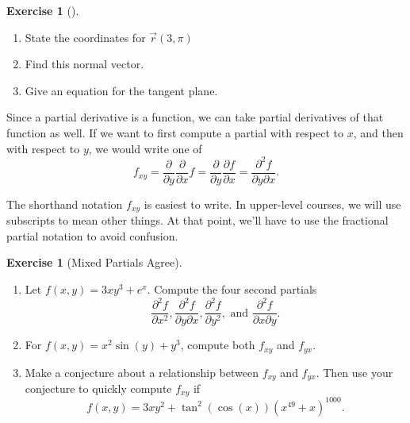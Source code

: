 \documentclass[10pt,]{book}
\theoremstyle{plain}
\theoremstyle{definition}
\theoremstyle{definition}
\theoremstyle{definition}
\theoremstyle{definition}
\newtheorem{exploration}[project]{Exercise}
\theoremstyle{definition}
\numberwithin{equation}{section}
\newcommand{\ds}{\displaystyle}
\begin{document}
\begin{exploration}[]\label{exploration-140}
\leavevmode%
\begin{enumerate}[font=\bfseries,label=(\alph*),ref=\alph*]
\item\label{task-306} State the coordinates for \(\vec r (3,\pi)\)%
\item\label{task-307} Find this normal vector.%
\item\label{task-308} Give an equation for the tangent plane.%
\end{enumerate}
\end{exploration}
Since a partial derivative is a function, we can take partial derivatives of that function as well. If we want to first compute a partial with respect to \(x\), and then with respect to \(y\), we would write one of%
\begin{equation*}
f_{xy}=\ds\frac{\partial}{\partial y}\frac{\partial}{\partial x}f = \frac{\partial}{\partial y}\frac{\partial f}{\partial x} = \frac{\partial^2 f}{\partial y \partial x}.
\end{equation*}
%
\par
The shorthand notation \(f_{xy}\) is easiest to write. In upper-level courses, we will use subscripts to mean other things. At that point, we'll have to use the fractional partial notation to avoid confusion.%
\begin{exploration}[Mixed Partials Agree]\label{prob_second_partials_agree}
\leavevmode%
\begin{enumerate}[font=\bfseries,label=(\alph*),ref=\alph*]
\item\label{task-309} Let \(f(x,y)=3xy^3+e^{x}.\) Compute the four second partials%
\begin{equation*}
\ds \frac{\partial^2 f}{ \partial x^2}, \ds\frac{\partial^2 f}{\partial y \partial x}, \ds\frac{\partial^2 f}{\partial y^2},  \text{ and } \ds\frac{\partial^2 f}{\partial x \partial y}.
\end{equation*}
%
\item\label{task-310} For \(f(x,y)=x^2\sin(y)+y^3\), compute both \(f_{xy}\) and \(f_{yx}\).%
\item\label{task-311} Make a conjecture about a relationship between \(f_{xy}\) and \(f_{yx}\). Then use your conjecture to quickly compute \(f_{xy}\) if%
\begin{equation*}
f(x,y)=3xy^2+\tan^{2}(\cos(x)) (x^{49}+x)^{1000}.
\end{equation*}
%
\end{enumerate}
\end{exploration}
\typeout{************************************************}
\typeout{************************************************}
\end{document}
